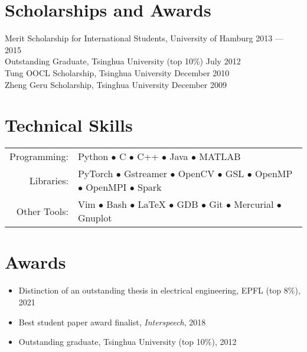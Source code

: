 \documentclass[a4paper,9pt]{extarticle} %
\begin{document}

\section{Scholarships and Awards}

Merit Scholarship for International Students, University of Hamburg \hfill 2013 --- 2015 \\
Outstanding Graduate, Tsinghua University (top 10\%) \hfill July 2012 \\
Tung OOCL Scholarship, Tsinghua University \hfill December 2010  \\
Zheng Geru Scholarship, Tsinghua University \hfill December 2009

\fi


\section{Technical Skills}

\begin{tabular}{rl}
  Programming: & Python $\bullet$ C $\bullet$ C++ $\bullet$ Java $\bullet$ MATLAB \\
  Libraries: & PyTorch $\bullet$ Gstreamer $\bullet$ OpenCV $\bullet$ GSL $\bullet$ OpenMP $\bullet$ OpenMPI $\bullet$ Spark \\
  Other Tools: & Vim $\bullet$ Bash $\bullet$ \LaTeX{} $\bullet$ GDB $\bullet$ Git $\bullet$ Mercurial $\bullet$ Gnuplot \\
\end{tabular}


\section{Awards}

\begin{itemize}[itemsep=-.9em]
  \item Distinction of an outstanding thesis in electrical engineering, EPFL (top 8\%), 2021
  \item Best student paper award finalist, \textit{Interspeech}, 2018
  \item Outstanding graduate, Tsinghua University (top 10\%), 2012
\end{itemize}
\end{document}

